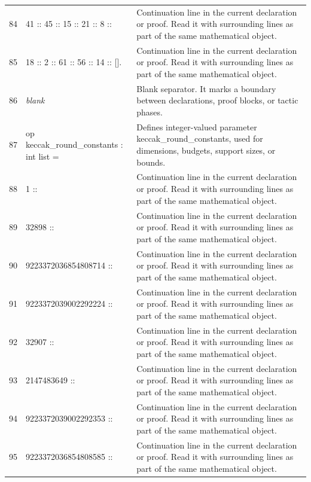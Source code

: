 \documentclass[10pt]{article}
\begin{document}
\begin{longtable}{r L{0.53\textwidth} L{0.37\textwidth}}
84 & {\ttfamily\scriptsize   41 :: 45 :: 15 :: 21 :: 8 ::} & Continuation line in the current declaration or proof.  Read it with surrounding lines as part of the same mathematical object. \\
85 & {\ttfamily\scriptsize   18 :: 2 :: 61 :: 56 :: 14 :: [].} & Continuation line in the current declaration or proof.  Read it with surrounding lines as part of the same mathematical object. \\
86 & {\ttfamily\scriptsize \emph{blank}} & Blank separator.  It marks a boundary between declarations, proof blocks, or tactic phases. \\
87 & {\ttfamily\scriptsize op keccak\_round\_constants : int list =} & Defines integer-valued parameter keccak\_round\_constants, used for dimensions, budgets, support sizes, or bounds. \\
88 & {\ttfamily\scriptsize   1 ::} & Continuation line in the current declaration or proof.  Read it with surrounding lines as part of the same mathematical object. \\
89 & {\ttfamily\scriptsize   32898 ::} & Continuation line in the current declaration or proof.  Read it with surrounding lines as part of the same mathematical object. \\
90 & {\ttfamily\scriptsize   9223372036854808714 ::} & Continuation line in the current declaration or proof.  Read it with surrounding lines as part of the same mathematical object. \\
91 & {\ttfamily\scriptsize   9223372039002292224 ::} & Continuation line in the current declaration or proof.  Read it with surrounding lines as part of the same mathematical object. \\
92 & {\ttfamily\scriptsize   32907 ::} & Continuation line in the current declaration or proof.  Read it with surrounding lines as part of the same mathematical object. \\
93 & {\ttfamily\scriptsize   2147483649 ::} & Continuation line in the current declaration or proof.  Read it with surrounding lines as part of the same mathematical object. \\
94 & {\ttfamily\scriptsize   9223372039002292353 ::} & Continuation line in the current declaration or proof.  Read it with surrounding lines as part of the same mathematical object. \\
95 & {\ttfamily\scriptsize   9223372036854808585 ::} & Continuation line in the current declaration or proof.  Read it with surrounding lines as part of the same mathematical object. \\

\end{longtable}
\end{document}
